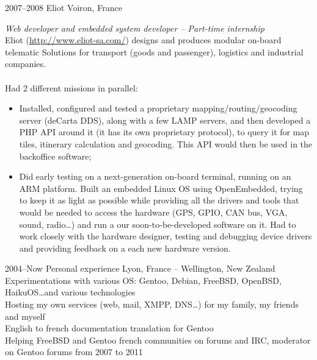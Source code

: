 \documentclass[]{friggeri-cv} %
\begin{document}
\begin{entrylist}
\entry
{2007--2008}
{Eliot}
{Voiron, France}
{\emph{Web developer and embedded system developer -- Part-time internship} \\
Eliot (\url{http://www.eliot-sa.com/}) designs and produces modular on-board telematic Solutions for transport (goods and passenger), logistics and industrial companies. \\
\\
Had 2 different missions in parallel:
\begin{itemize}
    \item Installed, configured and tested a proprietary mapping/routing/geocoding server (deCarta DDS), along with a few LAMP servers, and then developed a PHP API around it (it has its own proprietary protocol), to query it for map tiles, itinerary calculation and geocoding. This API would then be used in the backoffice software;
    \item Did early testing on a next-generation on-board terminal, running on an ARM platform. Built an embedded Linux OS using OpenEmbedded, trying to keep it as light as possible while providing all the drivers and tools that would be needed to access the hardware (GPS, GPIO, CAN bus, VGA, sound, radio\dots) and run a our soon-to-be-developed software on it. Had to work closely with the hardware designer, testing and debugging device drivers and providing feedback on a each new hardware version.
\end{itemize}}

\newpage

\entry
{2004--Now}
{Personal experience}
{Lyon, France -- Wellington, New Zealand}
{Experimentations with various OS: Gentoo, Debian, FreeBSD, OpenBSD, HaikuOS\dots and various technologies \\
Hosting my own services (web, mail, XMPP, DNS\dots) for my family, my friends and myself \\
English to french documentation translation for Gentoo \\
Helping FreeBSD and Gentoo french communities on forums and IRC, moderator on Gentoo forums from 2007 to 2011}
\end{entrylist}

\end{document}
